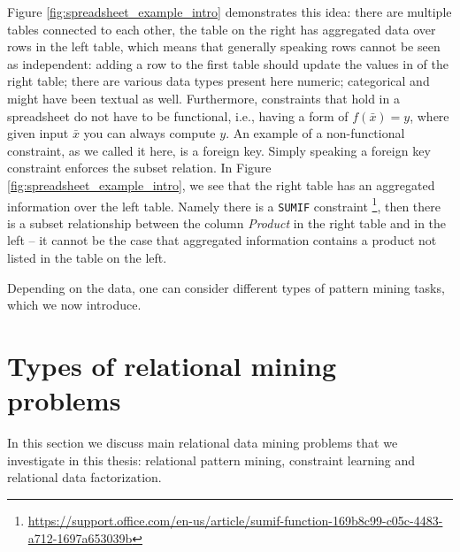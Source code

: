 Figure \ref{fig:spreadsheet_example_intro} demonstrates this idea:
there are multiple tables connected to each other, the table on the
right has aggregated data over rows in the left table, which means
that generally speaking rows cannot be seen as independent: adding a
row to the first table should update the values in of the right table;
there are various data types present here numeric; categorical and
might have been textual as well. Furthermore, constraints that hold in
a spreadsheet do not have to be functional, i.e., having a form of
$f(\bar x) = y$, where given input $\bar x$ you can always compute
$y$. An example of a non-functional constraint, as we called it here,
is a foreign key. Simply speaking a foreign key constraint enforces
the subset relation. In Figure \ref{fig:spreadsheet_example_intro}, we
see that the right table has an aggregated information over the left
table. Namely there is a \texttt{SUMIF} constraint \footnote{\url{https://support.office.com/en-us/article/sumif-function-169b8c99-c05c-4483-a712-1697a653039b}}, then there is a subset relationship between the column \textit{Product} in the right table and in the left -- it cannot be the case that aggregated information contains a product not listed in the table on the left.
\pubrevend

Depending on the data, one can consider different types of pattern
mining tasks, which we now introduce.

\section{Types of relational mining problems}\label{sec:rel_problems}
In this section we discuss main relational data mining problems that
we investigate in this thesis: relational pattern mining, constraint learning
and relational data factorization.




